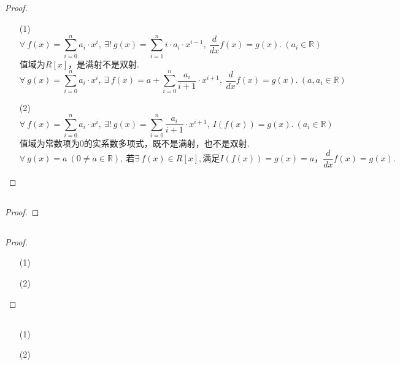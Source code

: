 \documentclass[UTF8]{ctexart}
\begin{document}
\subsection{}   %
\begin{proof}
    \begin{enumerate}
        \item []
        \item [(1)]
        \[
            \forall\ f(x)=\sum\limits_{i=0}^{n} a_i\cdot x^i,\ 
            \exists !\ g(x)=\sum\limits_{i=1}^{n} i\cdot a_i \cdot x^{i-1},\ 
            \frac{d}{dx}f(x)=g(x).\ (a_i \in\mathbb{R})
        \]
        值域为$R[x]$，是满射不是双射.
        \[
            \forall\ g(x)=\sum\limits_{i=0}^{n} a_i\cdot x^i,\ 
            \exists\ f(x)=a+\sum\limits_{i=0}^{n} \frac{a_i}{i+1} \cdot x^{i+1},\ 
            \frac{d}{dx}f(x)=g(x).\ (a,a_i \in\mathbb{R})
        \]
        \item [(2)]
        \[
            \forall\ f(x)=\sum\limits_{i=0}^{n} a_i\cdot x^i,\ 
            \exists !\ g(x)=\sum\limits_{i=0}^{n} \frac{a_i}{i+1} \cdot x^{i+1},\ 
            I(f(x))=g(x).\ (a_i \in\mathbb{R})
        \]
        值域为常数项为0的实系数多项式，既不是满射，也不是双射.
        \[
            \forall\ g(x)=a\ (0\neq a\in\mathbb{R}),\ 
            \mbox{若}\exists\ f(x)\in R[x],\mbox{满足} I(f(x))=g(x)=a，
            \frac{d}{dx}f(x)=g(x).
        \]
    \end{enumerate}
\end{proof}

\subsection{}   %
\begin{proof}
    
\end{proof}

\subsection{}   %
\begin{proof}
    \begin{enumerate}
        \item []
        \item [(1)]
        \item [(2)]
    \end{enumerate}
\end{proof}

\subsection{}   %
\begin{enumerate}
    \item [(1)]
    \item [(2)]
\end{enumerate}
\end{document}
